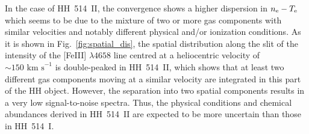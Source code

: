 \documentclass[fleqn,usenatbib]{mnras}
\begin{document}
In the case of HH~514~II, the convergence shows a higher dispersion in $n_{\rm e}-T_{\rm e}$ which seems to be due to the mixture of two or more gas components with similar velocities and notably different physical and/or ionization conditions. As it is shown in Fig.~\ref{fig:spatial_dis}, the spatial distribution along the slit of the intensity of the  [Fe\thinspace III] $\lambda 4658$ line centred at a heliocentric velocity of $\sim 150 \text{ km s}^{-1}$ is double-peaked in HH~514~II, which shows that at least two different gas components moving at a similar velocity are integrated in this part of the HH object. However, the separation into two spatial components results in a very low signal-to-noise spectra. Thus, the physical conditions and chemical abundances derived in HH~514~II are expected to be more uncertain than those in HH~514~I.
\end{document}

